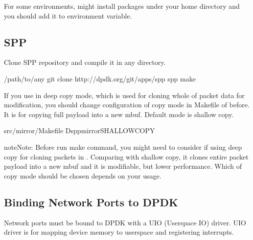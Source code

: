 \documentclass[a4paper,11pt,openany,oneside,english]{sphinxmanual}
\begin{document}
For some environments,  might install packages under your home
directory  and you should add it to  environment
variable.


\subsection{SPP}
\label{\detokenize{gsg/install:spp}}\label{\detokenize{gsg/install:setup-install-spp}}
Clone SPP repository and compile it in any directory.

\begin{sphinxVerbatim}[commandchars=\\\{\},formatcom=\footnotesize]
  /path/to/any
 git clone http://dpdk.org/git/apps/spp
  spp
 make  
\end{sphinxVerbatim}

If you use  in deep copy mode,
which is used for cloning whole of packet data for modification,
you should change configuration of copy mode in Makefile of 
before.
It is for copying full payload into a new mbuf.
Default mode is shallow copy.

\begin{sphinxVerbatim}[commandchars=\\\{\},formatcom=\footnotesize]
 src/mirror/Makefile
  \PYGZhy{}Dspp\PYGZus{}mirror\PYGZus{}SHALLOWCOPY
\end{sphinxVerbatim}

\begin{sphinxadmonition}{note}{Note:}
Before run make command, you might need to consider if using deep copy
for cloning packets in . Comparing with shallow copy, it
clones entire packet payload into a new mbuf and it is modifiable,
but lower performance. Which of copy mode should be chosen depends on
your usage.
\end{sphinxadmonition}


\subsection{Binding Network Ports to DPDK}
\label{\detokenize{gsg/install:binding-network-ports-to-dpdk}}
Network ports must be bound to DPDK with a UIO (Userspace IO) driver.
UIO driver is for mapping device memory to userspace and registering
interrupts.
\end{document}
